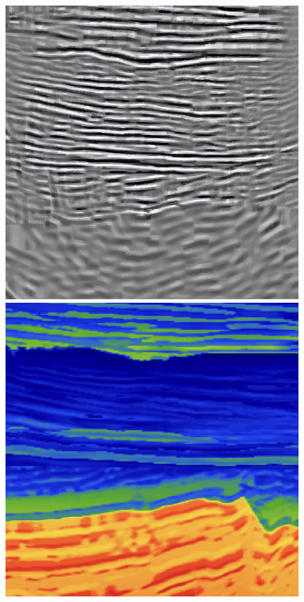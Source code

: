 \documentclass{IMAGE2025}
\begin{document}
\begin{figure}

\begin{minipage}{0.50\linewidth}

\includegraphics[width=0.9\linewidth,height=\textheight,keepaspectratio]{./figs/rtm483.png}

\end{minipage}%
%
\begin{minipage}{0.50\linewidth}

\includegraphics[width=0.9\linewidth,height=\textheight,keepaspectratio]{./figs/483_velo_rainbow.png}


\end{minipage}
\end{figure}
\end{document}
